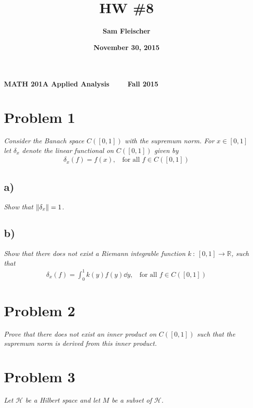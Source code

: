 \documentclass[12pt]{article}
\title{\bf HW \#8}
\author{\bf Sam Fleischer}
\date{\bf November 30, 2015}
\theoremstyle{plain}
\begin{document}
\noindent\textbf{MATH 201A \hfill Applied Analysis \ \ \ \ \hfill Fall 2015} 

{\let\newpage\relax\maketitle}

\section*{Problem 1}
\emph{Consider the Banach space $C([0,1])$ with the supremum norm.  For $x \in [0,1]$ let $\delta_x$ denote the linear functional on $C([0,1])$ given by}
\begin{align*}
    \delta_x(f) = f(x),\ \ \ \ \text{for all } f \in C([0,1])
\end{align*}

\subsection*{ a)}
\emph{Show that $\norm{\delta_x} = 1$.}

\subsection*{ b)}
\emph{Show that there does not exist a Riemann integrable function $k\ :\ [0,1] \rightarrow \mathbb{R}$, such that}
\begin{align*}
    \delta_x(f) = \int_0^1 k(y)f(y) \dd y,\ \ \ \ \text{for all } f \in C([0,1])
\end{align*}


\section*{Problem 2}
\emph{Prove that there does not exist an inner product on $C([0,1])$ such that the supremum norm is derived from this inner product.}

\section*{Problem 3}
\emph{Let $\mathcal{H}$ be a Hilbert space and let $M$ be a subset of $\mathcal{H}$.} \\
\end{document}
